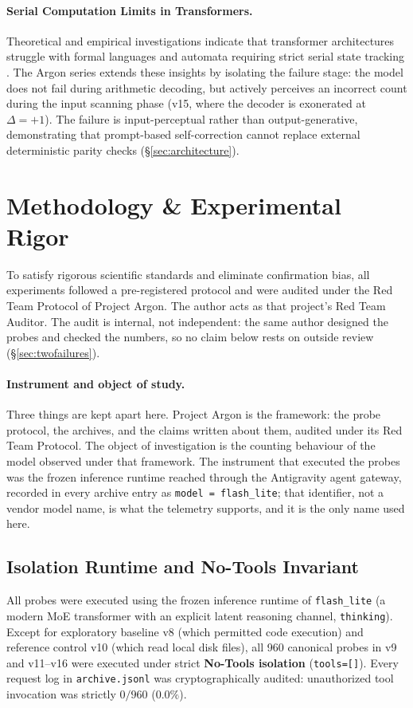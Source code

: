 \documentclass[11pt,a4paper]{article}
\begin{document}
\paragraph{Serial Computation Limits in Transformers.} Theoretical and empirical investigations indicate that transformer architectures struggle with formal languages and automata requiring strict serial state tracking \cite{deletang2023neural}. The Argon series extends these insights by isolating the failure stage: the model does not fail during arithmetic decoding, but actively perceives an incorrect count during the input scanning phase (v15, where the decoder is exonerated at $\Delta = +1$). The failure is input-perceptual rather than output-generative, demonstrating that prompt-based self-correction cannot replace external deterministic parity checks (\S\ref{sec:architecture}).

\section{Methodology \& Experimental Rigor}

To satisfy rigorous scientific standards and eliminate confirmation bias, all experiments followed a pre-registered protocol and were audited under the Red Team Protocol of Project Argon. The author acts as that project's Red Team Auditor. The audit is internal, not independent: the same author designed the probes and checked the numbers, so no claim below rests on outside review (\S\ref{sec:twofailures}).

\paragraph{Instrument and object of study.} Three things are kept apart here. Project Argon is the framework: the probe protocol, the archives, and the claims written about them, audited under its Red Team Protocol. The object of investigation is the counting behaviour of the model observed under that framework. The instrument that executed the probes was the frozen inference runtime reached through the Antigravity agent gateway, recorded in every archive entry as \texttt{model = flash\_lite}; that identifier, not a vendor model name, is what the telemetry supports, and it is the only name used here.

\subsection{Isolation Runtime and No-Tools Invariant}
All probes were executed using the frozen inference runtime of \texttt{flash\_lite} (a modern MoE transformer with an explicit latent reasoning channel, \texttt{thinking}). Except for exploratory baseline v8 (which permitted code execution) and reference control v10 (which read local disk files), all 960 canonical probes in v9 and v11--v16 were executed under strict \textbf{No-Tools isolation} (\texttt{tools=[]}). Every request log in \texttt{archive.jsonl} was cryptographically audited: unauthorized tool invocation was strictly $0/960$ ($0.0\%$).
\end{document}
